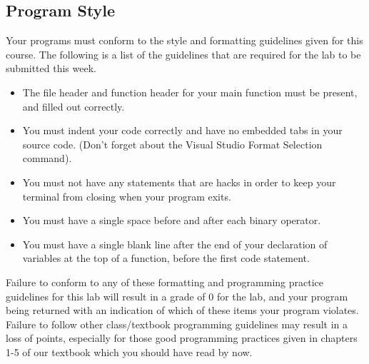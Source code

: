\documentclass[11pt]{article}
\begin{document}
\subsection*{Program Style}
\label{sec-6-2}


Your programs must conform to the style and formatting guidelines given for this course.
The following is a list of the guidelines that are required for the lab to be submitted
this week.

\begin{itemize}
\item The file header and function header for your main function must be present, and filled out correctly.
\item You must indent your code correctly and have no embedded tabs in your source code. (Don't forget about the Visual Studio Format Selection command).
\item You must not have any statements that are hacks in order to keep your terminal from closing when your program exits.
\item You must have a single space before and after each binary operator.
\item You must have a single blank line after the end of your declaration
  of variables at the top of a function, before the first code
  statement.
\end{itemize}

Failure to conform to any of these formatting and programming practice
guidelines for this lab will result in a grade of 0 for the lab, and
your program being returned with an indication of which of these items
your program violates.  Failure to follow other class/textbook
programming guidelines may result in a loss of points, especially for
those good programming practices given in chapters 1-5 of our textbook
which you should have read by now.
\end{document}
